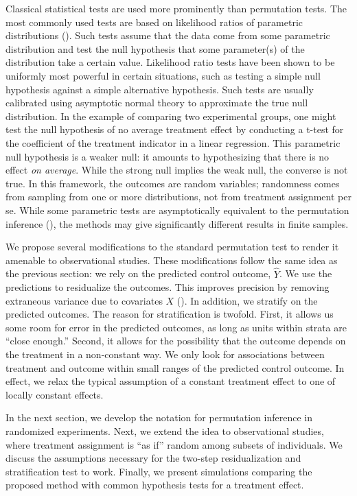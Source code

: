 \documentclass[12pt]{article}
\begin{document}
Classical statistical tests are used more prominently than permutation tests.
The most commonly used tests are based on likelihood ratios of parametric distributions (\cite{neyman_problem_1933}).
Such tests assume that the data come from some parametric distribution and test the null hypothesis that some parameter(s) of the distribution take a certain value.
Likelihood ratio tests have been shown to be uniformly most powerful in certain situations, such as testing a simple null hypothesis against a simple alternative hypothesis.
Such tests are usually calibrated using asymptotic normal theory to approximate the true null distribution.
In the example of comparing two experimental groups, one might test the null hypothesis of no average treatment effect by conducting a t-test for the coefficient of the treatment indicator in a linear regression.
This parametric null hypothesis is a weaker null: it amounts to hypothesizing that there is no effect \textit{on average}.
While the strong null implies the weak null, the converse is not true.
In this framework, the outcomes are random variables; randomness comes from sampling from one or more distributions, not from treatment assignment per se.
While some parametric tests are asymptotically equivalent to the permutation inference (\cite{samii_equivalencies_2012}), the methods may give significantly different results in finite samples.

We propose several modifications to the standard permutation test to render it amenable to observational studies.
These modifications follow the same idea as the previous section: we rely on the predicted control outcome, $\hat{Y}$.
We use the predictions to residualize the outcomes.
This improves precision by removing extraneous variance due to covariates $X$ (\cite{rosenbaum_covariance_2002}).
In addition, we stratify on the predicted outcomes.
The reason for stratification is twofold.
First, it allows us some room for error in the predicted outcomes, as long as units within strata are ``close enough.''
Second, it allows for the possibility that the outcome depends on the treatment in a non-constant way.
We only look for associations between treatment and outcome within small ranges of the predicted control outcome.
In effect, we relax the typical assumption of a constant treatment effect to one of locally constant effects.

In the next section, we develop the notation for permutation inference in randomized experiments.
Next, we extend the idea to observational studies, where treatment assignment is ``as if'' random among subsets of individuals.
We discuss the assumptions necessary for the two-step residualization and stratification test to work.
Finally, we present simulations comparing the proposed method with common hypothesis tests for a treatment effect.
\end{document}
